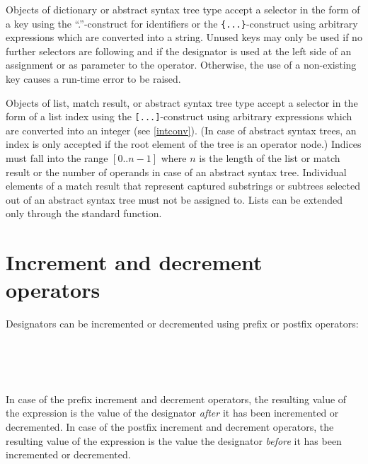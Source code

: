 Objects of dictionary or abstract syntax
tree type accept a selector in the form
of a key using the ``.''-construct for identifiers or the
\lstinline!{...}!-construct using arbitrary expressions which are
converted into a string. Unused keys may only be used if no further
selectors are following and if the designator is used at the left side
of an assignment or as parameter to the  operator.
Otherwise, the use of a non-existing key causes a run-time error to be
raised.

Objects of list, match result,
or abstract syntax tree type
accept a selector in the form of a list index using the
\lstinline![...]!-construct using arbitrary expressions which are
converted into an integer (see \ref{intconv}).
(In case of abstract syntax trees,
an index is only accepted if the root element of the tree is
an operator node.) Indices must fall into the range $[0..n-1]$
where $n$ is the length of the list or match result or the number
of operands in case of an abstract syntax tree. Individual
elements of a match result that represent captured substrings or
subtrees selected out of an abstract syntax tree must
not be assigned to. Lists can be extended only through the
 standard function.

\section{Increment and decrement operators}

Designators can be incremented or decremented using prefix
or postfix operators:

\begin{grammar}
      \produces \lextoken{++}  \\
      \produces \lextoken{-{}-}  \\
      \produces {} \lextoken{++} \\
      \produces {} \lextoken{-{}-}
\end{grammar}

\noindent
In case of the prefix increment and decrement operators,
the resulting value of the expression is the value of
the designator \emph{after} it has been incremented or decremented.
In case of the postfix increment and decrement operators,
the resulting value of the expression is the value
the designator \emph{before} it has been incremented or decremented.

